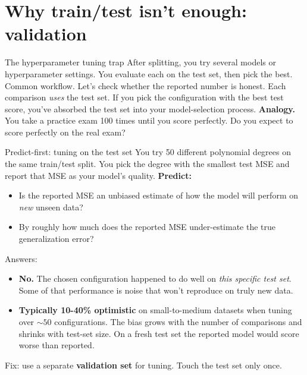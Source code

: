 \documentclass[aspectratio=169]{beamer}
\begin{document}
\section{Why train/test isn't enough: validation}

\begin{frame}{The hyperparameter tuning trap}
  After splitting, you try several models or hyperparameter settings. You evaluate each on the test set, then pick the best.
  \vfill
  Common workflow. Let's check whether the reported number is honest.
  \vfill
  Each comparison \emph{uses} the test set. If you pick the configuration with the best test score, you've absorbed the test set into your model-selection process.
  \vfill
  \textbf{Analogy.} You take a practice exam 100 times until you score perfectly. Do you expect to score perfectly on the real exam?
\end{frame}

\begin{frame}{Predict-first: tuning on the test set}
  You try 50 different polynomial degrees on the same train/test split. You pick the degree with the smallest test MSE and report that MSE as your model's quality.
  \vfill
  \pause
  \textbf{Predict:}
  \begin{itemize}
    \item Is the reported MSE an unbiased estimate of how the model will perform on \emph{new} unseen data?
    \item By roughly how much does the reported MSE under-estimate the true generalization error?
  \end{itemize}
  \pause
  \vfill
  Answers:
  \begin{itemize}
    \item \textbf{No.} The chosen configuration happened to do well on \emph{this specific test set}. Some of that performance is noise that won't reproduce on truly new data.
    \item \textbf{Typically 10-40\% optimistic} on small-to-medium datasets when tuning over $\sim 50$ configurations. The bias grows with the number of comparisons and shrinks with test-set size. On a fresh test set the reported model would score worse than reported.
  \end{itemize}
  Fix: use a separate \textbf{validation set} for tuning. Touch the test set only once.
\end{frame}
\end{document}
